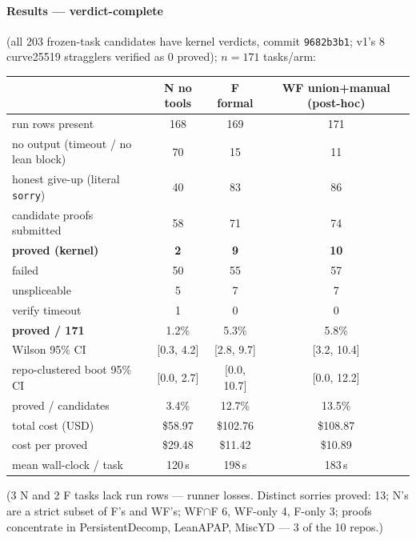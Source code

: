 \documentclass[10pt]{article}
\newcommand{\code}[1]{\texttt{#1}}
\newcommand{\best}[1]{\textbf{#1}}
\begin{document}
\paragraph{Results --- verdict-complete} (all 203 frozen-task candidates
have kernel verdicts, commit \code{9682b3b1}; v1's 8 curve25519 stragglers
verified as 0 proved); $n=171$ tasks/arm:

\begin{center}
\footnotesize
\begin{tabular}{@{}lccc@{}}
\toprule
 & N no tools & F formal & WF union+manual (post-hoc) \\
\midrule
run rows present & 168 & 169 & 171 \\
no output (timeout / no lean block) & 70 & 15 & 11 \\
honest give-up (literal \code{sorry}) & 40 & 83 & 86 \\
candidate proofs submitted & 58 & 71 & 74 \\
\best{proved (kernel)} & \best{2} & \best{9} & \best{10} \\
failed & 50 & 55 & 57 \\
unspliceable & 5 & 7 & 7 \\
verify timeout & 1 & 0 & 0 \\
\midrule
\best{proved / 171} & 1.2\% & 5.3\% & 5.8\% \\
Wilson 95\% CI & [0.3, 4.2] & [2.8, 9.7] & [3.2, 10.4] \\
repo-clustered boot 95\% CI & [0.0, 2.7] & [0.0, 10.7] & [0.0, 12.2] \\
proved / candidates & 3.4\% & 12.7\% & 13.5\% \\
total cost (USD) & \$58.97 & \$102.76 & \$108.87 \\
cost per proved & \$29.48 & \$11.42 & \$10.89 \\
mean wall-clock / task & 120\,s & 198\,s & 183\,s \\
\bottomrule
\end{tabular}
\end{center}

(3 N and 2 F tasks lack run rows --- runner losses. Distinct sorries
proved: 13; N's are a strict subset of F's and WF's; WF$\cap$F 6, WF-only
4, F-only 3; proofs concentrate in PersistentDecomp, LeanAPAP, MiscYD ---
3 of the 10 repos.)
\end{document}
